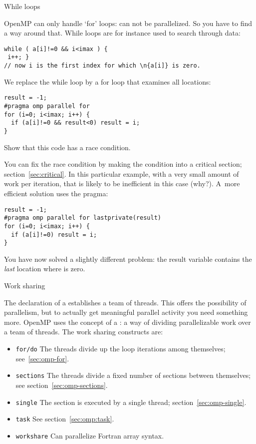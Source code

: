  {While loops}

OpenMP can only handle `for' loops:  can not
be parallelized. So you have to find a way around that. While loops
are for instance used to search through data:
\begin{verbatim}
while ( a[i]!=0 && i<imax ) {
 i++; }
// now i is the first index for which \n{a[i]} is zero.
\end{verbatim}
We replace the while loop by a for loop that examines all locations:
\begin{verbatim}
result = -1;
#pragma omp parallel for
for (i=0; i<imax; i++) {
  if (a[i]!=0 && result<0) result = i;
}
\end{verbatim}
\begin{exercise}
  Show that this code has a race condition.
\end{exercise}
You can fix the race condition by making the condition into a critical section;
section~\ref{sec:critical}. In this particular example, with a very small amount
of work per iteration, that is likely to be inefficient 
in this case (why?).
A~more efficient solution uses the  pragma:
\begin{verbatim}
result = -1;
#pragma omp parallel for lastprivate(result)
for (i=0; i<imax; i++) {
  if (a[i]!=0) result = i;
}
\end{verbatim}
You have now solved a slightly different problem: the result variable
contains the \emph{last} location where  is zero.

 {Work sharing}

The declaration of a  establishes a team of
threads. This offers the possibility of parallelism, but to actually
get meaningful parallel activity you need something more.
OpenMP uses the concept of a : a way of dividing parallelizable work over a team of threads.
The work sharing constructs are:
\begin{itemize}
\item \texttt{for/do} The threads divide up the loop iterations among
  themselves; see~\ref{sec:omp-for}.
\item \texttt{sections} The threads divide a fixed number of sections
  between themselves; see section~\ref{sec:omp-sections}.
\item \texttt{single} The section is executed by a single thread; section~\ref{sec:omp-single}.
\item \texttt{task} See section~\ref{sec:omp:task}.
\item \texttt{workshare} Can parallelize Fortran array syntax.
\end{itemize}

